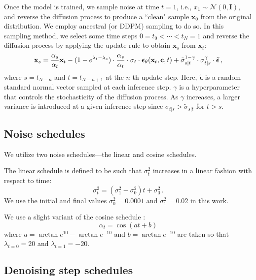 \documentclass[nohyperref]{article}
\theoremstyle{plain}
\theoremstyle{definition}
\theoremstyle{remark}
\begin{document}
Once the model is trained, we sample noise at time $t=1$, i.e., $x_1 \sim \mathcal{N}(0, \mathbf{I})$, and reverse the diffusion process to produce a ``clean" sample $\mathbf{x}_0$ from the original distribution. We employ ancestral (or DDPM) sampling \cite{ho2020denoising} to do so. In this sampling method, we select some time steps $0 = t_0 < \cdots < t_N = 1$ and reverse the diffusion process by applying the update rule to obtain $\mathbf{x}_s$ from $\mathbf{x}_t$:
\begin{equation}
\mathbf{x}_s = {\alpha_s \over \alpha_t} \mathbf{x}_t -
(1 - e^{\lambda_t - \lambda_s})\cdot {\alpha_s \over \alpha_t} \cdot \sigma_t \cdot \bm\epsilon_\theta(\mathbf{x}_t, \mathbf{c}, t) +
\tilde{\sigma}_{s|t}^{1 - \gamma} \cdot {\sigma}_{t|s}^{\gamma} \cdot \bm{\tilde{\epsilon}} \,,
\end{equation}
where $s = t_{N-n}$ and $t = t_{N-n+1}$ at the $n$-th update step. Here, $\bm{\tilde{\epsilon}}$ is a random standard normal vector sampled at each inference step. $\gamma$ is a hyperparameter that controls the stochasticity of the diffusion process. As $\gamma$ increases, a larger variance is introduced at a given inference step since $\sigma_{t|s} > \tilde{\sigma}_{s|t}$ for $t > s$.

\subsection{Noise schedules}

We utilize two noise schedules---the linear \cite{ho2020denoising} and cosine \cite{nichol2021improved} schedules.

The linear schedule \cite{ho2020denoising} is defined to be such that $\sigma_t^2$ increases in a linear fashion with respect to time:
\begin{equation}
\sigma_t^2 = (\sigma_1^2 - \sigma_0^2) t + \sigma_0^2 \,.
\end{equation}
We use the initial and final values $\sigma_0^2 = 0.0001$ and $\sigma_1^2 = 0.02$ in this work.

We use a slight variant of the cosine schedule \cite{nichol2021improved}:
\begin{equation}
\alpha_t = \cos (at + b)
\end{equation}
where $a=\arctan e^{10} - \arctan e^{-10}$ and $b=\arctan e^{-10}$ are taken so that $\lambda_{t=0} = 20$ and $\lambda_{t=1} = -20$.


\subsection{Denoising step schedules}
\end{document}
